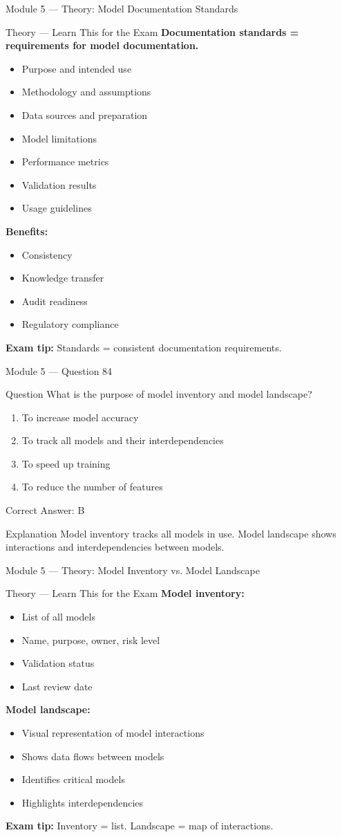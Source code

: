 \documentclass[aspectratio=169,10pt]{beamer}
\newcommand{\question}[1]{%
	\begin{block}{Question}
		#1
	\end{block}
}
\newcommand{\options}[4]{%
	\begin{enumerate}[label=\Alph*.,leftmargin=*]
		\item #1
		\item #2
		\item #3
		\item #4
	\end{enumerate}
}
\newcommand{\answerbox}[1]{%
	\begin{exampleblock}{Correct Answer: #1}
	\end{exampleblock}
}
\newcommand{\explain}[1]{%
	\begin{block}{Explanation}
		\small #1
	\end{block}
}
\newcommand{\theory}[1]{%
	\begin{block}{Theory --- Learn This for the Exam}
		\small #1
	\end{block}
}
\begin{document}
	\begin{frame}{Module 5 --- Theory: Model Documentation Standards}
		\theory{
			\textbf{Documentation standards = requirements for model documentation.}
			\begin{itemize}
				\item Purpose and intended use
				\item Methodology and assumptions
				\item Data sources and preparation
				\item Model limitations
				\item Performance metrics
				\item Validation results
				\item Usage guidelines
			\end{itemize}
			\textbf{Benefits:}
			\begin{itemize}
				\item Consistency
				\item Knowledge transfer
				\item Audit readiness
				\item Regulatory compliance
			\end{itemize}
			\textbf{Exam tip:} Standards = consistent documentation requirements.
		}
	\end{frame}
	
	\begin{frame}{Module 5 --- Question 84}
		\question{What is the purpose of model inventory and model landscape?}
		\options{To increase model accuracy}{To track all models and their interdependencies}{To speed up training}{To reduce the number of features}
		\answerbox{B}
		\explain{Model inventory tracks all models in use. Model landscape shows interactions and interdependencies between models.}
	\end{frame}
	
	\begin{frame}{Module 5 --- Theory: Model Inventory vs. Model Landscape}
		\theory{
			\textbf{Model inventory:}
			\begin{itemize}
				\item List of all models
				\item Name, purpose, owner, risk level
				\item Validation status
				\item Last review date
			\end{itemize}
			\textbf{Model landscape:}
			\begin{itemize}
				\item Visual representation of model interactions
				\item Shows data flows between models
				\item Identifies critical models
				\item Highlights interdependencies
			\end{itemize}
			\textbf{Exam tip:} Inventory = list. Landscape = map of interactions.
		}
	\end{frame}
	
\end{document}
